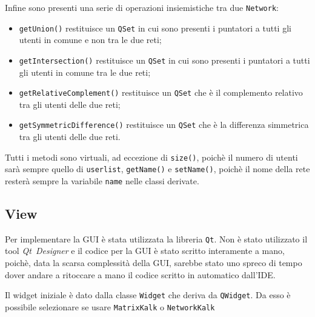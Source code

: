 Infine sono presenti una serie di operazioni insiemistiche tra due \texttt{Network}: 
\begin{itemize}[noitemsep]
    \item \texttt{getUnion()} restituisce un \texttt{QSet} in cui sono presenti i puntatori a tutti gli utenti
    in comune e non tra le due reti;
    \item \texttt{getIntersection()} restituisce un \texttt{QSet} in cui sono presenti i puntatori a tutti gli 
    utenti in comune tra le due reti;
    \item \texttt{getRelativeComplement()} restituisce un \texttt{QSet} che è il complemento relativo tra gli utenti 
    delle due reti;
    \item \texttt{getSymmetricDifference()} restituisce un \texttt{QSet} che è la differenza simmetrica tra gli utenti
    delle due reti.
\end{itemize}

Tutti i metodi sono virtuali, ad eccezione di \texttt{size()}, poichè il numero di utenti sarà sempre quello di 
\texttt{userlist}, \texttt{getName()} e \texttt{setName()}, poichè il nome della rete resterà sempre la variabile
\texttt{name} nelle classi derivate.
 
\subsection{View}

Per implementare la GUI è stata utilizzata la libreria \texttt{Qt}. Non è stato utilizzato il tool \mbox{\emph{Qt Designer}} e il codice per la GUI è stato scritto
interamente a mano, poichè, data la scarsa complessità della GUI, sarebbe stato uno spreco di tempo dover andare a ritoccare a mano
il codice scritto in automatico dall'IDE.\par
Il widget iniziale è dato dalla classe 
\texttt{Widget} che deriva da \texttt{QWidget}. Da esso è possibile selezionare se usare \texttt{MatrixKalk} 
o \texttt{NetworkKalk}

